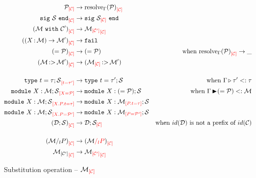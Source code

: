 \begin{align*}
  \Osubst{\iC}{\iP}
  &\to \Osubst{\iC}{\resolve{\E}{\iP}}\\
  \Osubst{\iC}{\Ssig{\iS}}
  &\to \Ssig{\Osubst{\iC}{\iS}}\\
  \Osubst{\iC}{(\Swith{\iM}{\iC'})}
  &\to \Osubst{\iC}{\Osubst{\iC'}{\iM}}\\
  \Osubst{\iC}{(\Sfunctor{\ix}{\iM}{\iM'})}
  &\to \texttt{fail}\\
  \Osubst{\iC}{\Salias{\iP}}
  &\to \Salias{\iP} &\text{when } \Osubst{\iC}{\resolve{\E}{\iP}}\to \_\\
  \Osubst{\iC}{\Stransp{\iM}{\iM'}}
  &\to \Stransp{\Osubst{\iC}{\iM}}{\iM'}\\[4mm]
  \Osubst{t = \tau'}{\Stype{t}{\tau};\iS}
  &\to \Stype{t}{\tau'};\iS
  &\text{when } \subtyp{\E}{\tau'}{\tau}\\
  \Osubst{\ix = \iP}{\Smodulety{\ix}{\iM};\iS}
  &\to \Smodulety{\ix}{\Salias{\iP}};\iS
  &\text{when } \submod{\E}{\Salias{\iP}}{\iM}\\
  \Osubst{\ix.\ip.t = \tau}{\Smodulety{\ix}{\iM};\iS}
  &\to \Smodulety{\ix}{\Osubst{\ip.t = \tau}{\iM}};\iS\\
  \Osubst{\ix.\ip = \iP'}{\Smodulety{\ix}{\iM};\iS}
  &\to \Smodulety{\ix}{\Osubst{\ip = \iP'}{\iM}};\iS\\
  \Osubst{\iC}{(\iD;\iS)}
  &\to \iD;\Osubst{\iC}{\iS}
  &\text{when } id(\iD) \text{ is not a prefix of } id(\iC)\\[4mm]
  \Osubst{\iC}{(\Sstrengthen{l}{\ip}{\iM})}
  &\to \Osubst{\iC}{(\Ostrengthen{l}{\ip}{\iM})}\\
  \Osubst{\iC}{\Ssubst{\iC'}{\iM}}
  &\to \Osubst{\iC}{\Osubst{\iC'}{\iM}}\\
\end{align*}\vspace{-3mm}
\caption{Substitution operation -- $\Osubst{\iC}{\iM}$}
\label{module:subst}


